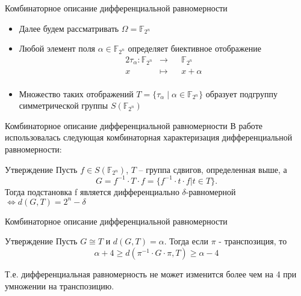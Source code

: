 \documentclass[11pt]{beamer}
\begin{document}
\begin{frame}{Комбинаторное описание дифференциальной равномерности}
\begin{itemize}
\item Далее будем рассматривать $\Omega = \mathbb{F}_{2^n}$
\item Любой элемент поля $\alpha \in \mathbb{F}_{2^n}$ определяет биективное отображение 
\begin{alignat*}{2}
\tau_{\alpha} \colon \mathbb{F}_{2^n}&\rightarrow {}&& \mathbb{F}_{2^n} \\
           x&\mapsto     {}&& x + \alpha \\        
\end{alignat*}
\item Множество таких отображений $T = \{ \tau_{ \alpha } \; | \; \alpha \in \mathbb{F}_{2^n} \}$ образует подгруппу симметрической группы $S(\mathbb{F}_{2^n})$
\end{itemize}
\end{frame}




\begin{frame}{Комбинаторное описание дифференциальной равномерности}
В работе использовалась следующая комбинаторная характеризация дифференциальной равномерности:
\begin{block}{Утверждение}
Пусть $f \in S(\mathbb{F}_{2^n})$, $T$ -- группа сдвигов, определенная выше, а $$G = f^{-1} \cdot T \cdot f = \{f^{-1} \cdot t \cdot f | t \in T \}.$$ Тогда подстановка f является дифференциально $\delta$-равномерной $ \iff d(G,T) = 2^n-\delta$
\end{block}

\end{frame}











\begin{frame}{Комбинаторное описание дифференциальной равномерности}
\begin{block}{Утверждение}
Пусть $G \cong T$ и $d(G,T) = \alpha$. Тогда если $\pi $ - транспозиция, то $$\alpha + 4 \geq d(\pi^{-1} \cdot G \cdot \pi, T) \geq \alpha - 4$$
\end{block}

Т.е. дифференциальная равномерность не может изменится более чем на 4 при умножении на транспозицию. \footnotemark[1]

\end{frame}
\end{document}
